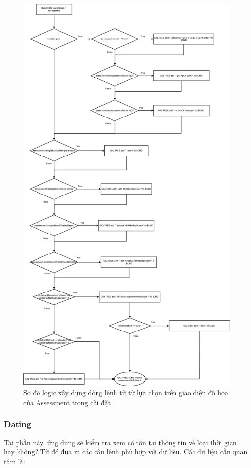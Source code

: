\documentclass[12pt]{report}
\begin{document}
\begin{figure}[h]
	\centering
	\includegraphics[scale=0.27]{Image/4.11.png}
	\caption{Sơ đồ logic xây dựng dòng lệnh từ từ lựa chọn trên giao diện đồ họa của Assessment trong cài đặt }
	\label{fig:image4.11}
\end{figure}

\subsubsection{Dating}
Tại phần này, ứng dụng sẽ kiểm tra xem có tồn tại thông tin về loại thời gian hay không? Từ đó đưa ra các câu lệnh phù hợp với dữ liệu. Các dữ liệu cần quan tâm là:
\end{document}
